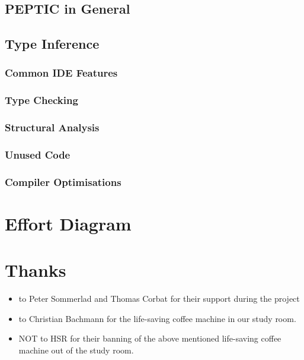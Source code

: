 \documentclass[12pt,halfparskip]{scrreprt}
\begin{document}
\subsection{PEPTIC in General}
\subsection{Type Inference}
\subsubsection{Common IDE Features}
\subsubsection{Type Checking}
\subsubsection{Structural Analysis}
\subsubsection{Unused Code}
\subsubsection{Compiler Optimisations}

\clearpage

\section{Effort Diagram}

\clearpage

\section{Thanks}

\begin{itemize}
	\item to Peter Sommerlad and Thomas Corbat for their support during the project
	\item to Christian Bachmann for the life-saving coffee machine in our study room. 
	\item NOT to HSR for their banning of the above mentioned life-saving coffee machine out of the study room.	
\end{itemize}



\listoffigures



\end{document}
